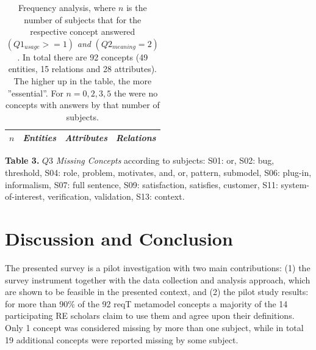 \documentclass[a4paper]{llncs}
\begin{document}
\vspace{-3.2em}
\begingroup
\setlength{\tabcolsep}{4pt} %
\renewcommand{\arraystretch}{1.35} %
\begin{table}
\begin{center}
\fontsize{7}{8}\selectfont
\caption{Frequency analysis, where $n$ is the number of subjects that for the respective concept answered $(Q1_{usage}>= 1)$ \textit{and} $(Q2_{meaning} = 2)$. In total there are 92 concepts (49 entities, 15 relations and 28 attributes). The higher up in the table, the more ''essential''. For $n = 0, 2, 3, 5$ the were no concepts with answers by that number of subjects.}
\label{table:frequency}
\begin{tabular}{l | p{} | p{} | p{}}
\textit{$n$} & \textit{Entities} & \textit{Attributes} & \textit{Relations} \\ \hline

\end{tabular}
\end{center}

\vspace{0.1cm}
\fontsize{9}{10}\selectfont 
\textbf{Table 3.} $Q3$ \emph{Missing Concepts} according to subjects:
S01: or, 
S02: bug, threshold,
S04: role, problem, motivates, and, or, pattern, submodel,
S06: plug-in, informalism, 
S07: full sentence, 
S09: satisfaction, satisfies, customer,
S11: system-of-interest, verification, validation, S13: context. 
\end{table}
\endgroup





\section{Discussion and Conclusion}\label{section:discussion}

The presented survey is a pilot investigation with two main contributions: (1) the survey instrument together with the data collection and analysis approach, which are shown to be feasible in the presented context, and (2) the pilot study results: for more than 90\% of the 92 reqT metamodel concepts a majority of the 14 participating RE scholars claim to use them and agree upon their definitions. Only 1 concept was considered missing by more than one subject, while in total 19 additional concepts were reported missing by some subject. 
\end{document}
